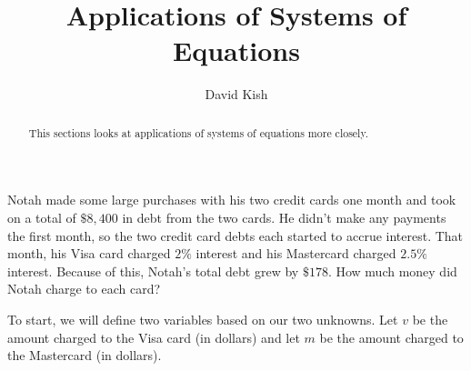 \documentclass[nooutcomes]{ximera}
\author{David Kish}
\title{Applications of Systems of Equations}
\begin{document}
\begin{abstract}
This sections looks at applications of systems of equations more closely.
\end{abstract}
\maketitle
\begin{example}
          Notah made some large purchases with his two credit cards one month and took on a total of
          $\$8{,}400$ in debt from the two cards.
          He didn't make any payments the first month,
          so the two credit card debts each started to accrue interest.
          That month, his Visa card charged $2\%$ interest and his Mastercard charged $2.5\%$ interest.
          Because of this, Notah's total debt grew by $\$178$.
          How much money did Notah charge to each card?\\
\begin{explanation}
          To start, we will define two variables based on our two unknowns.
          Let $v$ be the amount charged to the Visa card
          (in dollars)
          and let $m$ be the amount charged to the Mastercard
          (in dollars).
    

\end{explanation}
\end{example}
\end{document}
